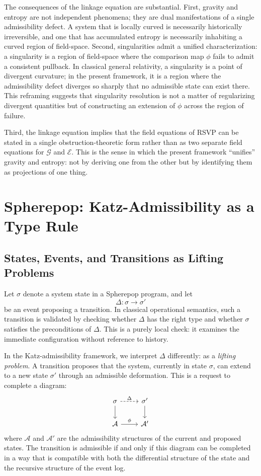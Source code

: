 \documentclass[12pt]{article}
\begin{document}
The consequences of the linkage equation are substantial. First, gravity and entropy
are not independent phenomena; they are dual manifestations of a single admissibility
defect. A system that is locally curved is necessarily historically irreversible, and
one that has accumulated entropy is necessarily inhabiting a curved region of
field-space. Second, singularities admit a unified characterization: a singularity is a
region of field-space where the comparison map $\phi$ fails to admit a consistent
pullback. In classical general relativity, a singularity is a point of divergent
curvature; in the present framework, it is a region where the admissibility defect
diverges so sharply that no admissible state can exist there. This reframing suggests
that singularity resolution is not a matter of regularizing divergent quantities but of
constructing an extension of $\phi$ across the region of failure.

Third, the linkage equation implies that the field equations of RSVP can be stated in
a single obstruction-theoretic form rather than as two separate field equations for
$\mathcal{G}$ and $\mathcal{E}$. This is the sense in which the present framework
``unifies'' gravity and entropy: not by deriving one from the other but by identifying
them as projections of one thing.

\section{Spherepop: Katz-Admissibility as a Type Rule}

\subsection{States, Events, and Transitions as Lifting Problems}

Let $\sigma$ denote a system state in a Spherepop program, and let
\[
\Delta : \sigma \to \sigma'
\]
be an event proposing a transition. In classical operational semantics, such a
transition is validated by checking whether $\Delta$ has the right type and whether
$\sigma$ satisfies the preconditions of $\Delta$. This is a purely local check: it
examines the immediate configuration without reference to history.

In the Katz-admissibility framework, we interpret $\Delta$ differently: as a
\emph{lifting problem}. A transition proposes that the system, currently in state
$\sigma$, can extend to a new state $\sigma'$ through an admissible deformation. This
is a request to complete a diagram:
\[
\begin{tikzcd}
\sigma \arrow[r, dashed, "\Delta"] \arrow[d] & \sigma' \arrow[d] \\
\mathcal{A} \arrow[r, "\phi"] & \mathcal{A}'
\end{tikzcd}
\]
where $\mathcal{A}$ and $\mathcal{A}'$ are the admissibility structures of the current
and proposed states. The transition is admissible if and only if this diagram can be
completed in a way that is compatible with both the differential structure of the state
and the recursive structure of the event log.
\end{document}

